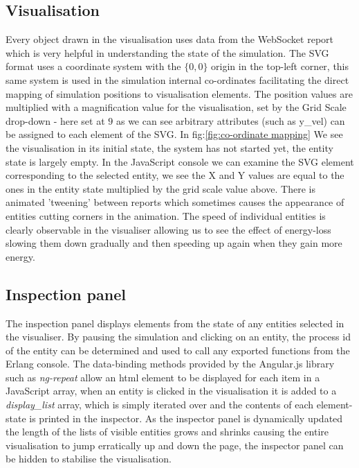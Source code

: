 \subsection{Visualisation}
Every object drawn in the visualisation uses data from the WebSocket report which is very helpful in understanding the state of the simulation. The SVG format uses a coordinate system with the \( \{ 0,0 \} \) origin in the top-left corner, this same system is used in the simulation internal co-ordinates facilitating the direct mapping of simulation positions to visualisation elements. 
The position values are multiplied with a magnification value for the visualisation, set by the Grid Scale drop-down - here set at \(9\) as we can see arbitrary attributes (such as y\_vel) can be assigned to each element of the SVG. In fig:\ref{fig:co-ordinate mapping} We see the visualisation in its initial state, the system has not started yet, the entity state is largely empty. In the JavaScript console we can examine the SVG element corresponding to the selected entity, we see the X and Y values are equal to the ones in the entity state multiplied by the grid scale value above.
There is animated 'tweening' between reports which sometimes causes the appearance of entities cutting corners in the animation. The speed of individual entities is clearly observable in the visualiser allowing us to see the effect of energy-loss slowing them down gradually and then speeding up again when they gain more energy.
\subsection{Inspection panel}
\label{inspector_panel}
The inspection panel displays elements from the state of any entities selected in the visualiser. By pausing the simulation and clicking on an entity, the process id of the entity can be determined and used to call any exported functions from the Erlang console. The data-binding methods provided by the Angular.js library such as \emph{ng-repeat} allow an html element to be displayed for each item in a JavaScript array, when an entity is clicked in the visualisation it is added to a \emph{display\_list} array, which is simply iterated over and the contents of each element-state is printed in the inspector.
As the inspector panel is dynamically updated the length of the lists of visible entities grows and shrinks causing the entire visualisation to jump erratically up and down the page, the inspector panel can be hidden to stabilise the visualisation. 
